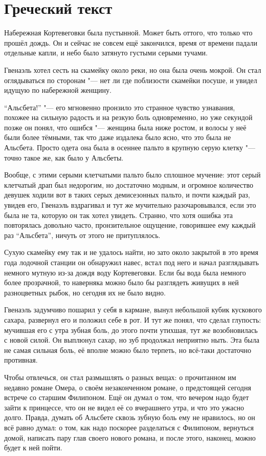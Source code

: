 \section{Греческий текст}

Набережная Кортевеговки была пустынной.
Может быть оттого, что только что прошёл дождь.
Он и сейчас не совсем ещё закончился, время от времени падали отдельные капли,
и небо было затянуто густыми серыми тучами.

Гвенаэль хотел сесть на скамейку около реки, но она была очень мокрой.
Он стал оглядываться по сторонам "--- нет ли где поблизости скамейки посуше, и
увидел идущую по набережной женщину.

\enquote{Альсбета!} "--- его мгновенно пронзило это странное чувство узнавания,
похожее на сильную радость и на резкую боль одновременно, но уже секундой позже
он понял, что ошибся "--- женщина была ниже ростом, и волосы у неё были более
тёмными, так что даже издалека было ясно, что это была не Альсбета.
Просто одета она была в осеннее пальто в крупную серую клетку "--- точно такое
же, как было у Альсбеты.

Вообще, с этими серыми клетчатыми пальто было сплошное мучение: этот серый
клетчатый драп был недорогим, но достаточно модным, и огромное количество
девушек ходили вот в таких серых демисезонных пальто, и почти каждый раз,
увидев его, Гвенаэль вздрагивал и тут же мучительно разочаровывался, если это
была не та, которую он так хотел увидеть.
Странно, что хотя ошибка эта повторялась довольно часто, пронзительное
ощущение, говорившее ему каждый раз \enquote{Альсбета}, ничуть от этого не
притуплялось.

Сухую скамейку ему так и не удалось найти, но зато около закрытой в это время
года лодочной станции он обнаружил навес, встал под него и начал разглядывать
немного мутную из-за дождя воду Кортевеговки.
Если бы вода была немного более прозрачной, то наверняка можно было бы
разглядеть живущих в ней разноцветных рыбок, но сегодня их не было видно.

Гвенаэль задумчиво пошарил у себя в кармане, вынул небольшой кубик кускового
сахара, развернул его и положил себе в рот.
И тут же понял, что сделал глупость: мучившая его с утра зубная боль, до этого
почти утихшая, тут же возобновилась с новой силой.
Он выплюнул сахар, но зуб продолжал неприятно ныть.
Эта была не самая сильная боль, её вполне можно было терпеть, но всё-таки
достаточно противная.

Чтобы отвлечься, он стал размышлять о разных вещах: о прочитанном им недавно
романе Омера, о своём незаконченном романе, о предстоящей сегодня встрече со
старшим Филипоном.
Ещё он думал о том, что вечером надо будет зайти к принцессе, что он не видел
её со вчерашнего утра, и что это ужасно долго.
Правда, думать об Альсбете сквозь зубную боль ему не нравилось, но он всё равно
думал: о том, как надо поскорее разделаться с Филипоном, вернуться домой,
написать пару глав своего нового романа, и после этого, наконец, можно будет к
ней пойти.

